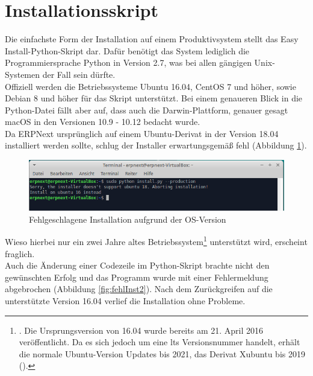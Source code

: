 \section{Installationsskript}
Die einfachste Form der Installation auf einem Produktivsystem stellt das \glqq Easy Install\grqq-Python-Skript dar. Dafür benötigt das System lediglich die Programmiersprache Python in Version 2.7, was bei allen gängigen Unix-Systemen der Fall sein dürfte. \\
Offiziell werden die Betriebssysteme Ubuntu 16.04, CentOS 7 und höher, sowie Debian 8 und höher für das Skript unterstützt. Bei einem genaueren Blick in die Python-Datei fällt aber auf, dass auch die Darwin-Plattform, genauer gesagt macOS in den Versionen 10.9 - 10.12 bedacht wurde.\\
Da ERPNext ursprünglich auf einem Ubuntu-Derivat in der Version 18.04 installiert werden sollte, schlug der Installer erwartungsgemäß fehl (\vgl Abbildung \ref{fig:fehlInst}).
\begin{figure}[H]
  \centering
  \includegraphics[width=\textwidth]{Bilder/Fehlgeschlagene_Installation.PNG}
  \caption{Fehlgeschlagene Installation aufgrund der OS-Version}
  \label{fig:fehlInst}
\end{figure}
Wieso hierbei nur ein zwei Jahre altes Betriebssystem\footnote{\Vgl \cite{Ubuntu}. Die Ursprungsversion von 16.04 wurde bereits am 21. April 2016 veröffentlicht. Da es sich jedoch um eine \gls{lts} Versionsnummer handelt, erhält die normale Ubuntu-Version Updates bis 2021, das Derivat Xubuntu bis 2019 (\vgl \cite{Xubuntu16}).}  unterstützt wird, erscheint fraglich.\\
Auch die Änderung einer Codezeile im Python-Skript brachte nicht den gewünschten Erfolg und das Programm wurde mit einer Fehlermeldung abgebrochen (\vgl Abbildung \ref{fig:fehlInst2}). Nach dem Zurückgreifen auf die unterstützte Version 16.04 verlief die Installation ohne Probleme.
